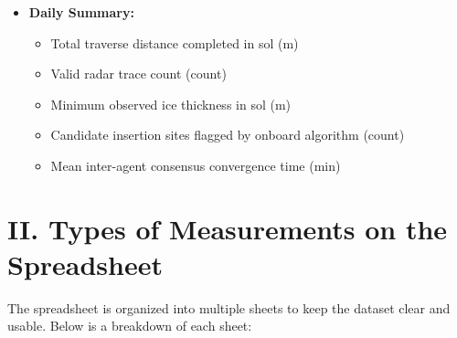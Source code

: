 \documentclass[11pt]{article}
\begin{document}
\begin{itemize}[leftmargin=1.5em]
    \item \textbf{Daily Summary:}
    \begin{itemize}
        \item Total traverse distance completed in sol (m)
        \item Valid radar trace count (count)
        \item Minimum observed ice thickness in sol (m)
        \item Candidate insertion sites flagged by onboard algorithm (count)
        \item Mean inter-agent consensus convergence time (min)
    \end{itemize}

\end{itemize}


\section*{II. Types of Measurements on the Spreadsheet}

\noindent The spreadsheet is organized into multiple sheets to keep the dataset clear and usable.
Below is a breakdown of each sheet:
\end{document}
